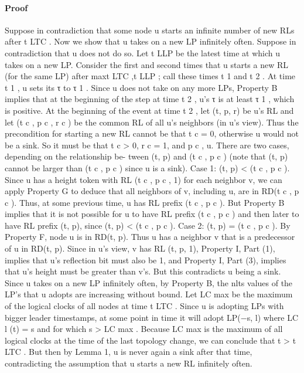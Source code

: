 \documentclass{article}
\begin{document}
\paragraph{Proof}
Suppose in contradiction that some node u starts an
infinite number of new RLs after t LTC .
Now we show that u takes on a new LP infinitely often.
Suppose in contradiction that u does not do so. Let t LLP be
the latest time at which u takes on a new LP. Consider the
first and second times that u starts a new RL (for the same
LP) after max{t LTC ,t LLP }; call these times t 1 and t 2 .
At time t 1 , u sets its τ to τ 1 . Since u does not take on any
more LPs, Property B implies that at the beginning of the
step at time t 2 , u’s τ is at least τ 1 , which is positive.
At the beginning of the event at time t 2 , let (t, p, r) be u’s
RL and let (t c , p c , r c ) be the common RL of all u’s neighbors
(in u’s view). Thus the precondition for starting a new RL
cannot be that t c = 0, otherwise u would not be a sink. So it
must be that t c > 0, r c = 1, and p c , u.
There are two cases, depending on the relationship be-
tween (t, p) and (t c , p c ) (note that (t, p) cannot be larger
than (t c , p c ) since u is a sink).
Case 1: (t, p) < (t c , p c ). Since u has a height token with
RL (t c , p c , 1) for each neighbor v, we can apply Property
G to deduce that all neighbors of v, including u, are in
RD(t c , p c ). Thus, at some previous time, u has RL prefix
(t c , p c ). But Property B implies that it is not possible for u
to have RL prefix (t c , p c ) and then later to have RL prefix
(t, p), since (t, p) < (t c , p c ).
Case 2: (t, p) = (t c , p c ). By Property F, node u is in
RD(t, p). Thus u has a neighbor v that is a predecessor of u
in RD(t, p). Since in u’s view, v has RL (t, p, 1), Property
I, Part (1), implies that u’s reflection bit must also be 1, and
Property I, Part (3), implies that u’s height must be greater
than v’s. But this contradicts u being a sink.
Since u takes on a new LP infinitely often, by Property
B, the nlts values of the LP’s that u adopts are increasing
without bound. Let LC max be the maximum of the logical
clocks of all nodes at time t LTC . Since u is adopting LPs
with bigger leader timestamps, at some point in time it will
adopt LP(−s, l) where LC l (t) = s and for which s > LC max .
Because LC max is the maximum of all logical clocks at the
time of the last topology change, we can conclude that t >
t LTC . But then by Lemma 1, u is never again a sink after
that time, contradicting the assumption that u starts a new
RL infinitely often.
\end{document}
